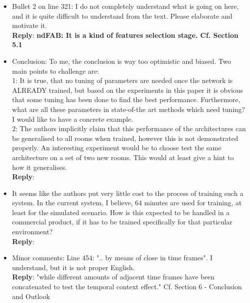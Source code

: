 \documentclass[11pt, technote, letterpaper, oneside, onecolumn]{IEEEtran}
\begin{document}
\begin{itemize}
\item Bullet 2 on line 321: I do not completely understand what is going on here, and it is quite difficult to understand from the text. Please elaborate and motivate it.\\
\textbf{Reply}: \textbf{ndFAB: It is a kind of features selection stage. Cf. Section 5.1}

\item Conclusion: To me, the conclusion is way too optimistic and biased. Two main points to challenge are:\\
 1: It is true, that no tuning of parameters are needed once the network is ALREADY trained, but based on the experiments in this paper it is obvious that some tuning has been done to find the best performance. Furthermore, what are all these parameters in state-of-the art methods which need tuning? I would like to have a concrete example.\\
 2: The authors implicitly claim that this performance of the architectures can be generalised to all rooms when trained, however this is not demonstrated properly. An interesting experiment would be to choose test the same architecture on a set of two new rooms. This would at least give a hint to how it generalises.\\
 \textbf{Reply}:

\item It seems like the authors put very little cost to the process of training such a system. In the current system, I believe, 64 minutes are used for training, at least for the simulated scenario. How is this expected to be handled in a commercial product, if it has to be trained specifically for that particular environment?\\
\textbf{Reply}:

\item Minor comments: Line 454: ".. by means of close in time frames". I understand, but it is not proper English.\\
\textbf{Reply}: "while different amounts of adjacent time frames have been concatenated to test the temporal context effect." Cf. Section 6 - Conclusion and Outlook
\end{itemize}

\newpage
\end{document}

